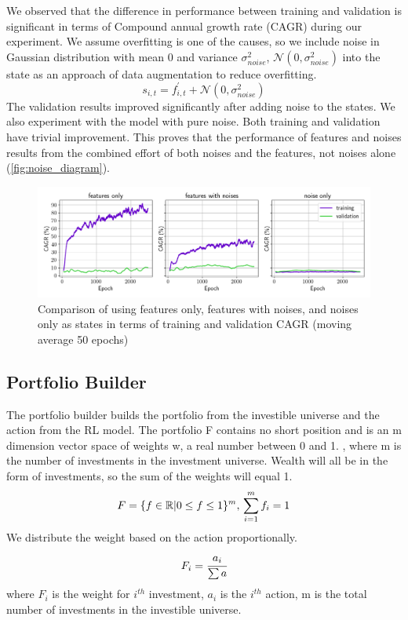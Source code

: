 We observed that the difference in performance between training and validation is significant in terms of Compound annual growth rate (CAGR) during our experiment. We assume overfitting is one of the causes, so we include noise in Gaussian distribution with mean 0 and variance \(\sigma_{noise}^2\), \(\mathcal{N}(0,\sigma_{noise}^2)\) into the state as an approach of data augmentation to reduce overfitting.
\[
    s_{i,t} = f^{'}_{i,t} + \mathcal{N}(0,\sigma_{noise}^2)
\]
The validation results improved significantly after adding noise to the states. We also experiment with the model with pure noise. Both training and validation have trivial improvement. This proves that the performance of features and noises results from the combined effort of both noises and the features, not noises alone (\autoref{fig:noise_diagram}). 
\begin{figure}[htb]
  \includegraphics[width=15cm]{images/compare_noise.png}
  \caption [Comparison of features/noise] {Comparison of using features only, features with noises, and noises only as states in terms of training and validation CAGR (moving average 50 epochs)}
  \label{fig:noise_diagram}
\end{figure}

\subsection {Portfolio Builder}
The portfolio builder builds the portfolio from the investible universe and the action from the RL model.
The portfolio F contains no short position and is an m dimension vector space of weights w, a real number between 0 and 1. , where m is the number of investments in the investment universe. Wealth will all be in the form of investments, so the sum of the weights will equal 1.
\[
    F = \{ {f \in \mathbb{R} | 0 \leq f \leq 1 } \} ^m,
    \\
    \sum_{i=1}^m {f_i} =1
\]
We distribute the weight based on the action proportionally.
\[
    F_i = \cfrac{a_i}{\sum a} 
\]
where \(F_i\) is the weight for \(i^{th}\) investment, \(a_i\) is the  \(i^{th}\) action, m is the total number of investments in the investible universe. 
